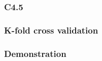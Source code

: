 \documentclass{beamer}
\begin{document}
\begin{frame}
\frametitle{C4.5}

\end{frame}






















\begin{frame}
\frametitle{K-fold cross validation}

\end{frame}

\begin{frame}
\frametitle{Demonstration}

\end{frame}
\end{document}
